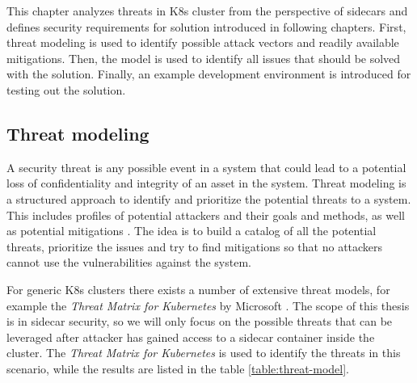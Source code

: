 \documentclass[english, 12pt, a4paper, sci, utf8, a-2b, online]{aaltothesis}
\begin{document}
This chapter analyzes threats in K8s cluster from the perspective of sidecars and defines security requirements for solution introduced in following chapters. First, threat modeling is used to identify possible attack vectors and readily available mitigations. Then, the model is used to identify all issues that should be solved with the solution. Finally, an example development environment is introduced for testing out the solution.

\subsection{Threat modeling}




A security threat is any possible event in a system that could lead to a potential loss of confidentiality and integrity of an asset in the system. Threat modeling is a structured approach to identify and prioritize the potential threats to a system. This includes profiles of potential attackers and their goals and methods, as well as potential mitigations \cite{shevchenko2018threat}. The idea is to build a catalog of all the potential threats, prioritize the issues and try to find mitigations so that no attackers cannot use the vulnerabilities against the system.

For generic K8s clusters there exists a number of extensive threat models, for example the \textit{Threat Matrix for Kubernetes} by Microsoft \cite{k8s-threat-matrix}. The scope of this thesis is in sidecar security, so we will only focus on the possible threats that can be leveraged after attacker has gained access to a sidecar container inside the cluster. The \textit{Threat Matrix for Kubernetes} is used to identify the threats in this scenario, while the results are listed in the table \ref{table:threat-model}.
\end{document}
